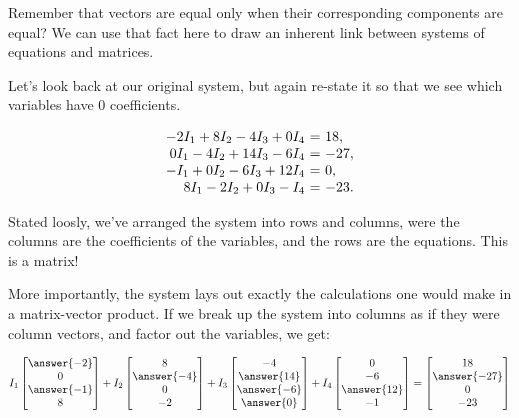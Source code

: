 \documentclass{ximera}
\begin{document}
\begin{example}
\begin{remark}

  Remember that vectors are equal only when their corresponding components are equal? We can use that fact here to draw an inherent link between systems of equations and matrices.

  Let's look back at our original system, but again re-state it so that we see which variables have $0$ coefficients.

  \begin{equation*}
    \begin{array}{r@{~}c@{~}l}
      -2I_1+8I_2-4I_3+0I_4&=&18, \\
      0I_1- 4I_2 + 14I_3 - 6I_4 &=& -27, \\
      -I_1 +0I_2- 6I_3 + 12I_4 &=& 0, \\
      8I_1-2I_2 +0I_3- I_4 &=& -23.
    \end{array}
  \end{equation*}

  Stated loosly, we've arranged the system into rows and columns, were the columns are the coefficients of the variables, and the rows are the equations. This is a matrix!

  More importantly, the system lays out exactly the calculations one would make in a matrix-vector product. If we break up the system into columns as if they were column vectors, and factor out the variables, we get:

$$I_1\begin{bmatrix}\answer{-2} \\ 0\\\answer{-1}\\8\end{bmatrix}
+I_2\begin{bmatrix}8 \\ \answer{-4}\\0\\-2\end{bmatrix}
+I_3\begin{bmatrix}-4 \\ \answer{14}\\\answer{-6}\\\answer{0}\end{bmatrix}
+I_4\begin{bmatrix}0 \\ -6\\\answer{12}\\-1\end{bmatrix}
=
\begin{bmatrix}18 \\ \answer{-27}\\0\\-23\end{bmatrix}$$


\end{remark}
\end{example}
\end{document}
